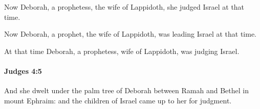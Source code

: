 			\begin{versebox}
					\item[BHS] 
					\item[ASV] Now Deborah, a prophetess, the wife of Lappidoth, she judged Israel at that time.
					\item[NIV] Now Deborah, a prophet, the wife of Lappidoth, was leading Israel at that time.
					\item[NRSV] At that time Deborah, a prophetess, wife of Lappidoth, was judging Israel.
			\end{versebox}

		\paragraph{Judges 4:5} %
			\label{JUDGES-4-5}

			And she dwelt under the palm tree of Deborah between Ramah and Bethel in mount Ephraim: and the children of Israel came up to her for judgment.

